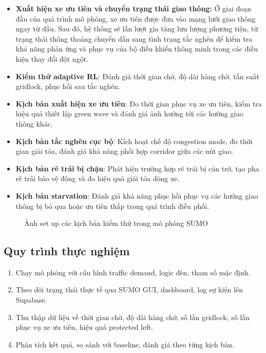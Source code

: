 \begin{itemize}
    \item \textbf{Xuất hiện xe ưu tiên và chuyển trạng thái giao thông:} Ở giai đoạn đầu của quá trình mô phỏng, xe ưu tiên được đưa vào mạng lưới giao thông ngay từ đầu. Sau đó, hệ thống sẽ lần lượt gia tăng lưu lượng phương tiện, từ trạng thái thông thoáng chuyển dần sang tình trạng tắc nghẽn để kiểm tra khả năng phản ứng và phục vụ của bộ điều khiển thông minh trong các điều kiện thay đổi đột ngột.
    \item \textbf{Kiểm thử adaptive RL}: Đánh giá thời gian chờ, độ dài hàng chờ, tần suất gridlock, phục hồi sau tắc nghẽn.
    \item \textbf{Kịch bản xuất hiện xe ưu tiên}: Đo thời gian phục vụ xe ưu tiên, kiểm tra hiệu quả thiết lập green wave và đánh giá ảnh hưởng tới các hướng giao thông khác.
    \item \textbf{Kịch bản tắc nghẽn cục bộ}: Kích hoạt chế độ congestion mode, đo thời gian giải tỏa, đánh giá khả năng phối hợp corridor giữa các nút giao.
    \item \textbf{Kịch bản rẽ trái bị chặn}: Phát hiện trường hợp rẽ trái bị cản trở, tạo pha rẽ trái bảo vệ động và đo hiệu quả giải tỏa dòng xe.
    \item \textbf{Kịch bản starvation}: Đánh giá khả năng phục hồi phục vụ các hướng giao thông bị bỏ qua hoặc ưu tiên thấp trong quá trình điều phối.
\end{itemize}

\begin{figure}[H]
    \centering
    \caption{Ảnh set up các kịch bản kiểm thử trong mô phỏng SUMO}
    \label{fig:sumo_test_scenarios}
\end{figure}

\subsection{Quy trình thực nghiệm}

\begin{enumerate}
    \item Chạy mô phỏng với cấu hình traffic demand, logic đèn, tham số mặc định.
    \item Theo dõi trạng thái thực tế qua SUMO GUI, dashboard, log sự kiện lên Supabase.
    \item Thu thập dữ liệu về thời gian chờ, độ dài hàng chờ, số lần gridlock, số lần phục vụ xe ưu tiên, hiệu quả protected left.
    \item Phân tích kết quả, so sánh với baseline, đánh giá theo từng kịch bản.
\end{enumerate}

